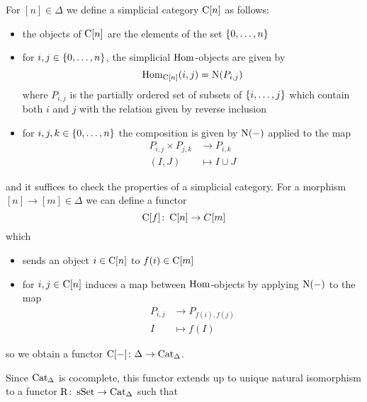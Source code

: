 \begin{definition}
    For $[n]\in\Delta$ we define a simplicial category $\operatorname{C}[n]$ as follows:
    \begin{itemize}
        \item the objects of $\operatorname{C}[n]$ are the elements of the set $\left\lbrace0,\ldots,n\right\rbrace$
        \item for $i,j\in\left\lbrace0,\ldots,n\right\rbrace$, the simplicial $\operatorname{Hom}$-objects are given by 
            \begin{equation*}
                \operatorname{Hom}_{\operatorname{C}[n]}(i,j)=\operatorname{N}(P_{i,j})
            \end{equation*}
            where $P_{i,j}$ is the partially ordered set of subsets of $\left\lbrace i,\ldots,j\right\rbrace$ which contain both $i$ and $j$ with the relation given by reverse inclusion
        \item for $i,j,k\in\left\lbrace0,\ldots,n\right\rbrace$ the composition is given by $\operatorname{N}(-)$ applied to the map
        \begin{align*}
                P_{i,j}\times P_{j,k}&\to P_{i,k}\\
                (I,J)&\mapsto I\cup J
        \end{align*}
    \end{itemize}
    and it suffices to check the properties of a simplicial category.
    For a morphism $[n]\to[m]\in\Delta$ we can define a functor
    \begin{equation*}
        \operatorname{C}[f]\colon\operatorname{C}[n]\to C[m]
    \end{equation*}
    which
    \begin{itemize}
        \item sends an object $i\in\operatorname{C}[n]$ to $f(i)\in\operatorname{C}[m]$
        \item for $i,j\in\operatorname{C}[n]$ induces a map between $\operatorname{Hom}$-objects by applying $\operatorname{N}(-)$ to the map
            \begin{align*}
                P_{i,j}&\to P_{f(i),f(j)}\\
                I&\mapsto f(I)
            \end{align*}
    \end{itemize}
    so we obtain a functor $\operatorname{C}[-]\colon\Delta\to\operatorname{Cat}_{\Delta}$.
    
    Since $\operatorname{Cat}_{\Delta}$ is cocomplete, this functor extends up to unique natural isomorphism to a functor $\operatorname{R}\colon\operatorname{sSet}\to\operatorname{Cat}_{\Delta}$ such that 
    \begin{center}
\end{center}
\end{definition}
